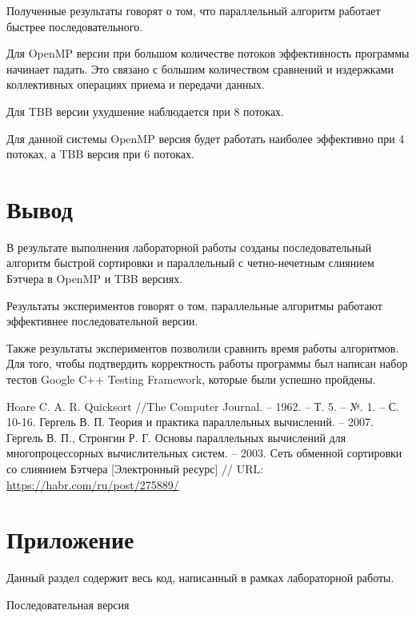 \documentclass{report}
\begin{document}
\par Полученные результаты говорят о том, что параллельный алгоритм работает быстрее последовательного. 
\par Для OpenMP версии при большом количестве потоков эффективность программы начинает падать. Это связано с большим количеством сравнений и издержками коллективных операциях приема и передачи данных.
\par Для TBB версии ухудшение наблюдается при 8 потоках. 
\par Для данной системы OpenMP версия будет работать наиболее эффективно при 4 потоках, а TBB версия при 6 потоках.
\newpage

\section*{Вывод}
В результате выполнения лабораторной работы созданы последовательный алгоритм быстрой сортировки и параллельный с четно-нечетным слиянием Бэтчера в OpenMP и TBB версиях.
\par Результаты экспериментов говорят о том, параллельные алгоритмы работают эффективнее последовательной версии.
\par Также результаты экспериментов позволили сравнить время работы алгоритмов. Для того, чтобы подтвердить корректность работы программы был написан набор тестов Google C++
Testing Framework, которые были успешно пройдены.

\newpage

\begin{thebibliography}{1}
Hoare C. A. R. Quicksort //The Computer Journal. – 1962. – Т. 5. – №. 1. – С. 10-16.
Гергель В. П. Теория и практика параллельных вычислений. – 2007. 
Гергель В. П., Стронгин Р. Г. Основы параллельных вычислений для многопроцессорных вычислительных систем. – 2003.
 Сеть обменной сортировки со слиянием Бэтчера [Электронный ресурс] // URL: \url{https://habr.com/ru/post/275889/}
\end{thebibliography}
\newpage

\section*{Приложение}
Данный раздел содержит весь код, написанный в рамках лабораторной работы.
\par Последовательная версия
\end{document}

